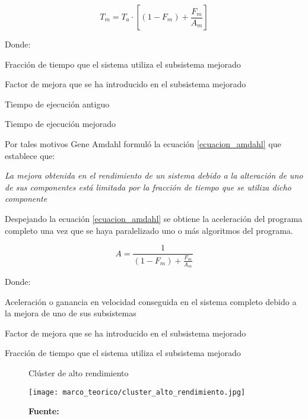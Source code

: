 \documentclass[../main/main.tex]{subfiles}
\begin{document}
  \vspace{-0.7cm}\begin{equation}
    T_m = T_a \cdot [( 1 - F_m ) + \frac{F_m}{A_m}]
    \label{ecuacion_amdahl}
  \end{equation}

  Donde:

  \begin{description}
    \item[$F_m=$] Fracción de tiempo que el sistema utiliza el subsistema mejorado
    \item[$A_m=$] Factor de mejora que se ha introducido en el subsistema mejorado
    \item[$T_a=$] Tiempo de ejecución antiguo
    \item[$T_m=$] Tiempo de ejecución mejorado
  \end{description}

  Por tales motivos Gene Amdahl formuló la ecuación \ref{ecuacion_amdahl} que establece que:

  \textit{La mejora obtenida en el rendimiento de un sistema debido a la alteración de uno de sus componentes está limitada por la fracción de tiempo que se utiliza dicho componente}

  Despejando la ecuación \ref{ecuacion_amdahl} se obtiene la aceleración del programa completo una vez que se haya paralelizado uno o más algoritmos del programa.

  \vspace{-0.7cm}\begin{equation}
    A = \frac{1}{( 1 - F_m ) + \frac{F_m}{A_m}}
    \label{ecuacion_amdahl_aceleracion}
  \end{equation}

  Donde:

  \begin{description}
    \item[$A=$] Aceleración o ganancia en velocidad conseguida en el sistema completo debido a la mejora de uno de sus subsistemas
    \item[$A_m=$] Factor de mejora que se ha introducido en el subsistema mejorado
    \item[$F_m=$] Fracción de tiempo que el sistema utiliza el subsistema mejorado
  \end{description}

  \begin{figure}[H]
    \centering
    \caption{Clúster de alto rendimiento}
    \texttt{[image: marco\_teorico/cluster\_alto\_rendimiento.jpg]}
    \caption*{\textbf{Fuente:} \cite[p.~2]{article:cluster_alto_rendimiento}}
  \end{figure}
\end{document}
